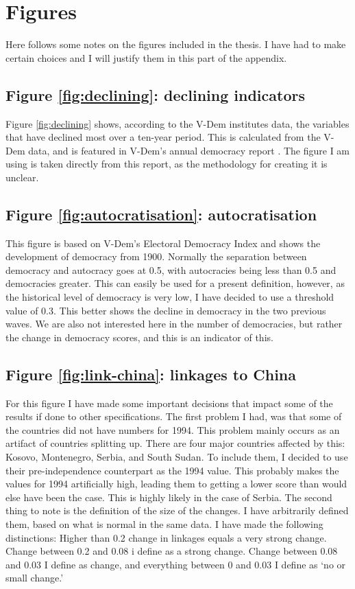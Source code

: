 \section{Figures}
Here follows some notes on the figures included in the thesis. I have had to make certain choices and I will justify them in this part of the appendix.  

\subsection{Figure \ref{fig:declining}: declining indicators}
Figure \ref{fig:declining} shows, according to the V-Dem institutes data, the variables that have declined most over a ten-year period. This is calculated from the V-Dem data, and is featured in V-Dem's annual democracy report \citep[p. 17]{nord_democracy_2025}. The figure I am using is taken directly from this report, as the methodology for creating it is unclear.

\subsection{Figure \ref{fig:autocratisation}: autocratisation}
This figure is based on V-Dem's Electoral Democracy Index and shows the development of democracy from 1900. Normally the separation between democracy and autocracy goes at 0.5, with autocracies being less than 0.5 and democracies greater. This can easily be used for a present definition, however, as the historical level of democracy is very low, I have decided to use a threshold value of 0.3. This better shows the decline in democracy in the two previous waves. We are also not interested here in the number of democracies, but rather the change in democracy scores, and this is an indicator of this.

\subsection{Figure \ref{fig:link-china}: linkages to China}
For this figure I have made some important decisions that impact some of the results if done to other specifications. The first problem I had, was that some of the countries did not have numbers for 1994. This problem mainly occurs as an artifact of countries splitting up. There are four major countries affected by this: Kosovo, Montenegro, Serbia, and South Sudan. To include them, I decided to use their pre-independence counterpart as the 1994 value. This probably makes the values for 1994 artificially high, leading them to getting a lower score than would else have been the case. This is highly likely in the case of Serbia. The second thing to note is the definition of the size of the changes. I have arbitrarily defined them, based on what is normal in the same data. I have made the following distinctions: Higher than 0.2 change in linkages equals a very strong change. Change between 0.2 and 0.08 i define as a strong change. Change between 0.08 and 0.03 I define as change, and everything between 0 and 0.03 I define as `no or small change.'


